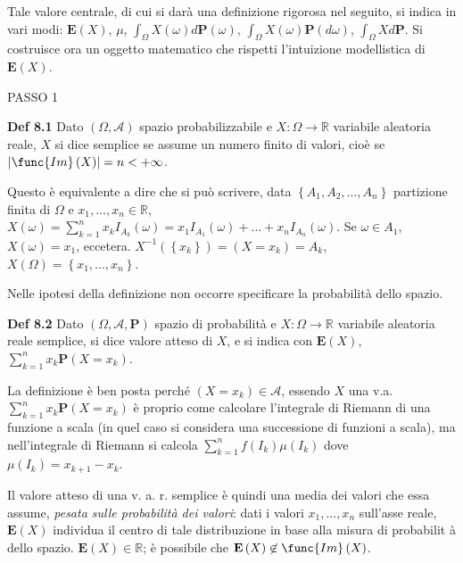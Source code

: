 \documentclass{article}
\begin{document}
Tale valore centrale, di cui si dar\`{a} una definizione rigorosa nel
seguito, si indica in vari modi: $\mathbf{E}\left( X\right) $, $\mu $, $%
\int_{\Omega }X\left( \omega \right) d\mathbf{P}\left( \omega \right) $, $%
\int_{\Omega }X\left( \omega \right) \mathbf{P}\left( d\omega \right) $, $%
\int_{\Omega }Xd\mathbf{P}$. Si costruisce ora un oggetto matematico che
rispetti l'intuizione modellistica di $\mathbf{E}\left( X\right) $.

PASSO 1

\textbf{Def 8.1} Dato $\left( \Omega ,\mathcal{A}\right) $ spazio
probabilizzabile e $X:\Omega \rightarrow 
\mathbb{R}
$ variabile aleatoria reale, $X$ si dice semplice se assume un numero finito
di valori, cio\`{e} se $\left\vert \func{Im}\left( X\right) \right\vert
=n<+\infty $.

Questo \`{e} equivalente a dire che si pu\`{o} scrivere, data $\left\{
A_{1},A_{2},...,A_{n}\right\} $ partizione finita di $\Omega $ e $%
x_{1},...,x_{n}\in 
\mathbb{R}
$, $X\left( \omega \right) =\sum_{k=1}^{n}x_{k}I_{A_{k}}\left( \omega
\right) =x_{1}I_{A_{1}}\left( \omega \right) +...+x_{n}I_{A_{n}}\left(
\omega \right) $. Se $\omega \in A_{1}$, $X\left( \omega \right) =x_{1}$,
eccetera. $X^{-1}\left( \left\{ x_{k}\right\} \right) =\left( X=x_{k}\right)
=A_{k}$, $X\left( \Omega \right) =\left\{ x_{1},...,x_{n}\right\} $.

Nelle ipotesi della definizione non occorre specificare la probabilit\`{a}
dello spazio.

\textbf{Def 8.2} Dato $\left( \Omega ,\mathcal{A},\mathbf{P}\right) $ spazio
di probabilit\`{a} e $X:\Omega \rightarrow 
\mathbb{R}
$ variabile aleatoria reale semplice, si dice valore atteso di $X$, e si
indica con $\mathbf{E}\left( X\right) $, $\sum_{k=1}^{n}x_{k}\mathbf{P}%
\left( X=x_{k}\right) $.

La definizione \`{e} ben posta perch\'{e} $\left( X=x_{k}\right) \in 
\mathcal{A}$, essendo $X$ una v.a. $\sum_{k=1}^{n}x_{k}\mathbf{P}\left(
X=x_{k}\right) $ \`{e} proprio come calcolare l'integrale di Riemann di una
funzione a scala (in quel caso si considera una successione di funzioni a
scala), ma nell'integrale di Riemann si calcola $\sum_{k=1}^{n}f\left(
I_{k}\right) \mu \left( I_{k}\right) $ dove $\mu \left( I_{k}\right)
=x_{k+1}-x_{k}$.

Il valore atteso di una v. a. r. semplice \`{e} quindi una media dei valori
che essa assume, \textit{pesata sulle probabilit\`{a} dei valori}: dati i
valori $x_{1},...,x_{n}$ sull'asse reale, $\mathbf{E}\left( X\right) $
individua il centro di tale distribuzione in base alla misura di probabilit%
\`{a} dello spazio. $\mathbf{E}\left( X\right) \in 
\mathbb{R}
$; \`{e} possibile che $\mathbf{E}\left( X\right) \not\in \func{Im}\left(
X\right) $.
\end{document}
